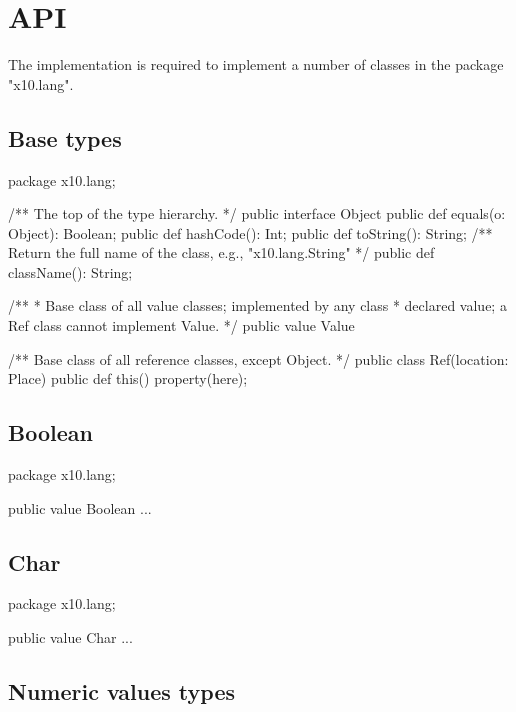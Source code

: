 \chapter{API}\label{XtenAPI}

The \Xten{} implementation is required to implement a number of
classes in the package \xcd"x10.lang".

\section{Base types}

\begin{xten}
package x10.lang;

/** The top of the type hierarchy. */
public interface Object {
    public def equals(o: Object): Boolean;
    public def hashCode(): Int;
    public def toString(): String;
    /** Return the full name of the class, e.g., "x10.lang.String" */
    public def className(): String;
}

/**
 * Base class of all value classes; implemented by any class
 * declared value; a Ref class cannot implement Value.
 */
public value Value { }

/** Base class of all reference classes, except Object. */
public class Ref(location: Place) {
    public def this() { property(here); }
}
\end{xten}

\section{Boolean}

\begin{xten}
package x10.lang;

public value Boolean { ... }
\end{xten}

\section{Char}

\begin{xten}
package x10.lang;

public value Char { ... }
\end{xten}

\section{Numeric values types}

